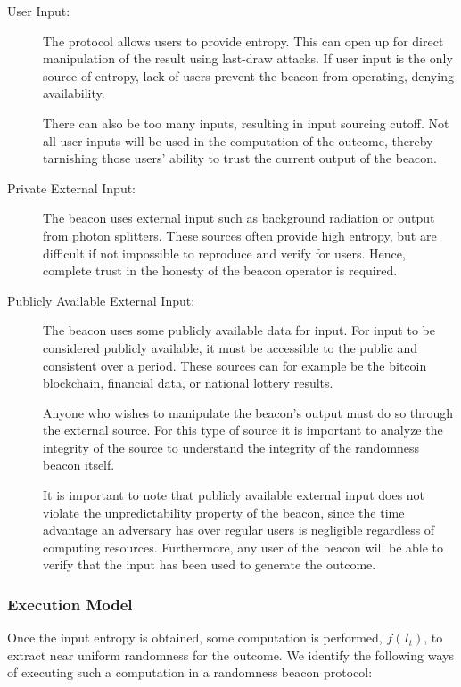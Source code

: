 \begin{description}
    \item[User Input:]
        The protocol allows users to provide entropy.
        This can open up for direct manipulation of the result using last-draw attacks.
        If user input is the only source of entropy, lack of users prevent the beacon from operating, denying availability.

        There can also be too many inputs, resulting in input sourcing cutoff. Not all user inputs will be used in the computation of the outcome, thereby tarnishing those users' ability to trust the current output of the beacon.

    \item[Private External Input:]
        The beacon uses external input such as background radiation or output from photon splitters.
        These sources often provide high entropy, but are difficult if not impossible to reproduce and verify for users. Hence, complete trust in the honesty of the beacon operator is required.

    \item[Publicly Available External Input:]
        The beacon uses some publicly available data for input. For input to be considered publicly available, it must be accessible to the public and consistent over a period.
        These sources can for example be the bitcoin blockchain, financial data, or national lottery results.

        Anyone who wishes to manipulate the beacon's output must do so through the external source.
        For this type of source it is important to analyze the integrity of the source to understand the integrity of the randomness beacon itself.

        It is important to note that publicly available external input does not violate the unpredictability property of the beacon, since the time advantage an adversary has over regular users is negligible regardless of computing resources.
        Furthermore, any user of the beacon will be able to verify that the input has been used to generate the outcome.

\end{description}

\subsubsection{Execution Model}
Once the input entropy is obtained, some computation is performed, $f(I_t)$, to extract near uniform randomness for the outcome.
We identify the following ways of executing such a computation in a randomness beacon protocol:

